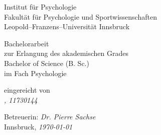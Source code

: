 \begin{titlepage}
   \begin{center}
        Institut für Psychologie\\
        Fakultät für Psychologie und Sportwissenschaften\\
        Leopold--Franzens--Universität Innsbruck
 
        \vspace{4cm}
        \textit{\textbf{\Large {\@title}}}
 
        \vspace{2cm}
        Bachelorarbeit\\
        zur Erlangung des akademischen Grades\\
        Bachelor of Science (B. Sc.)\\
        im Fach Psychologie
 
        \vspace{3cm}
        eingereicht von\\
        \textit{\@author, 11730144}
 
        \vfill
 
        Betreuerin: \textit{Dr. Pierre Sachse}\\
        Innsbruck, \textit{\today}
   \end{center}
\end{titlepage}